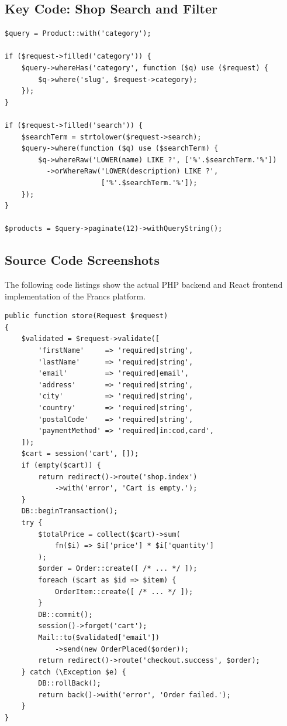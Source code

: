 \subsection{Key Code: Shop Search and Filter}
\begin{lstlisting}[style=phpstyle]
$query = Product::with('category');

if ($request->filled('category')) {
    $query->whereHas('category', function ($q) use ($request) {
        $q->where('slug', $request->category);
    });
}

if ($request->filled('search')) {
    $searchTerm = strtolower($request->search);
    $query->where(function ($q) use ($searchTerm) {
        $q->whereRaw('LOWER(name) LIKE ?', ['%'.$searchTerm.'%'])
          ->orWhereRaw('LOWER(description) LIKE ?', 
                       ['%'.$searchTerm.'%']);
    });
}

$products = $query->paginate(12)->withQueryString();
\end{lstlisting}


\subsection{Source Code Screenshots}
The following code listings show the actual PHP backend and React frontend implementation of the Francs platform.

\begin{lstlisting}[style=phpstyle, caption={Laravel Backend -- CheckoutController::store()}, label={lst:checkout}]
public function store(Request $request)
{
    $validated = $request->validate([
        'firstName'     => 'required|string',
        'lastName'      => 'required|string',
        'email'         => 'required|email',
        'address'       => 'required|string',
        'city'          => 'required|string',
        'country'       => 'required|string',
        'postalCode'    => 'required|string',
        'paymentMethod' => 'required|in:cod,card',
    ]);
    $cart = session('cart', []);
    if (empty($cart)) {
        return redirect()->route('shop.index')
            ->with('error', 'Cart is empty.');
    }
    DB::beginTransaction();
    try {
        $totalPrice = collect($cart)->sum(
            fn($i) => $i['price'] * $i['quantity']
        );
        $order = Order::create([ /* ... */ ]);
        foreach ($cart as $id => $item) {
            OrderItem::create([ /* ... */ ]);
        }
        DB::commit();
        session()->forget('cart');
        Mail::to($validated['email'])
            ->send(new OrderPlaced($order));
        return redirect()->route('checkout.success', $order);
    } catch (\Exception $e) {
        DB::rollBack();
        return back()->with('error', 'Order failed.');
    }
}
\end{lstlisting}

